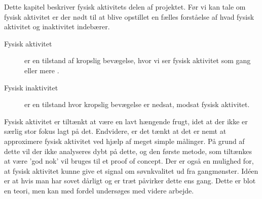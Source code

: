 Dette kapitel beskriver fysisk aktivitets delen af projektet.
Før vi kan tale om fysisk aktivitet er der nødt til at blive opstillet en fælles forståelse af hvad fysisk aktivitet og inaktivitet indebærer.
\begin{description}
\item[Fysisk aktivitet] er en tilstand af kropslig bevægelse, hvor vi ser fysisk aktivitet som gang eller mere \citep{misc:PhysicalActivity}.
\item[Fysisk inaktivitet] er en tilstand hvor kropslig bevægelse er nedsat, modsat fysisk aktivitet.
\end{description}

Fysisk aktivitet er tiltænkt at være en lavt hængende frugt, idet at der ikke er særlig stor fokus lagt på det.
Endvidere, er det tænkt at det er nemt at approximere fysisk aktivitet ved hjælp af meget simple målinger.
På grund af dette vil der ikke analyseres dybt på dette, og den første metode, som tiltænkes at være 'god nok' vil bruges til et proof of concept.
Der er også en mulighed for, at fysisk aktivitet kunne give et signal om søvnkvalitet ud fra gangmønster.
Idéen er at hvis man har sovet dårligt og er træt påvirker dette ens gang.
Dette er blot en teori, men kan med fordel undersøges med videre arbejde.